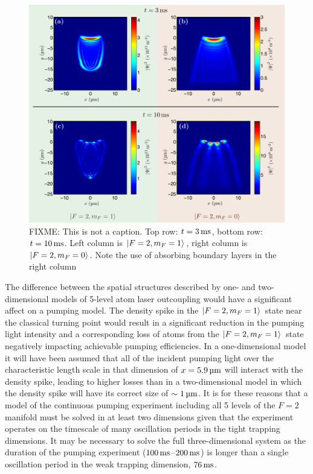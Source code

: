 \begin{figure}
    \centering
    \includegraphics[width=14cm]{5LevelAtomLaserSnapshots}
    \caption{FIXME: This is not a caption. Top row: $t = \unit[3]{ms}$, bottom row: $t = \unit[10]{ms}$.  Left column is ${\left|F=2, m_F=1\right>}$, right column is ${\left|F=2, m_F=0\right>}$.  Note the use of absorbing boundary layers in the right column}
    \label{OpticalPumping:5LevelAtomLaserSnapshots}
\end{figure}

The difference between the spatial structures described by one- and two-dimensional models of 5-level atom laser outcoupling would have a significant affect on a pumping model.  The density spike in the ${\left|F=2, m_F=1\right>}$ state near the classical turning point would result in a significant reduction in the pumping light intensity and a corresponding loss of atoms from the ${\left|F=2, m_F=1\right>}$ state negatively impacting achievable pumping efficiencies.  In a one-dimensional model it will have been assumed that all of the incident pumping light over the characteristic length scale in that dimension of $x = \unit[5.9]{\micro m}$ will interact with the density spike, leading to higher losses than in a two-dimensional model in which the density spike will have its correct size of $\sim\unit[1]{\micro m}$.  It is for these reasons that a model of the continuous pumping experiment including all 5 levels of the $F=2$ manifold must be solved in at least two dimensions given that the experiment operates on the timescale of many oscillation periods in the tight trapping dimensions.  It may be necessary to solve the full three-dimensional system as the duration of the pumping experiment ($\unit[100]{ms}$--$\unit[200]{ms}$) is longer than a single oscillation period in the weak trapping dimension, $\unit[76]{ms}$.

